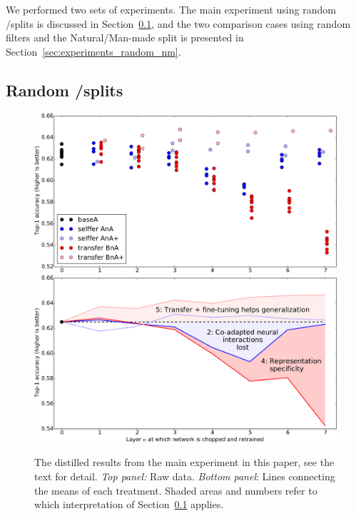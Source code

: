 We performed two sets of experiments. The main experiment using random \dA/\dB splits is discussed in Section~\ref{sec:experiments_ab}, and the two comparison cases using random filters and the Natural/Man-made split is presented in Section~\ref{sec:experiments_random_nm}.




\subsection{Random \dA/\dB splits}
\label{sec:experiments_ab}


\begin{figure}[t]
\begin{center}
\includegraphics[width=.85\linewidth]{plots/result_transfer_crop.pdf}
\includegraphics[width=.85\linewidth]{plots/result_transfer_lines_crop.pdf}
\end{center}
\caption{The distilled results from the main experiment in this paper, see the text for detail. \emph{Top panel:} Raw data. \emph{Bottom panel}: Lines connecting the means of each treatment. Shaded areas and numbers refer to which interpretation of Section~\ref{sec:experiments_ab} applies.
}
\label{fig:results}
\end{figure}

